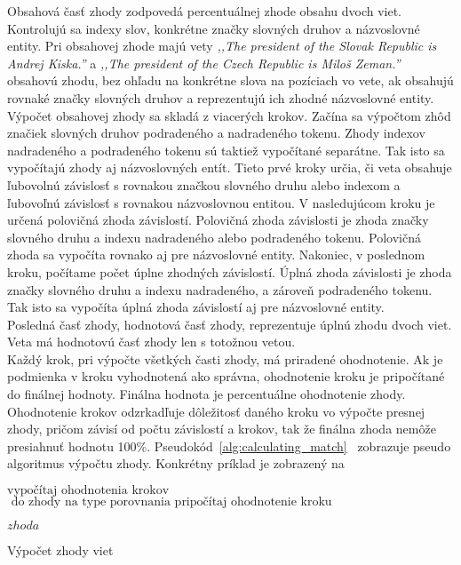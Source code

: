 Obsahová časť zhody zodpovedá percentuálnej zhode obsahu dvoch viet. Kontrolujú sa indexy slov, konkrétne značky slovných druhov a názvoslovné entity. Pri obsahovej zhode majú vety \textit{,,The president of the Slovak Republic is Andrej Kiska.''} a \textit{,,The president of the Czech Republic is Miloš Zeman.''} obsahovú zhodu, bez ohľadu na konkrétne slova na pozíciach vo vete, ak obsahujú rovnaké značky slovných druhov a reprezentujú ich zhodné názvoslovné entity. Výpočet obsahovej zhody sa skladá z viacerých krokov. Začína sa výpočtom zhôd značiek slovných druhov podradeného a nadradeného tokenu. Zhody indexov nadradeného a podradeného tokenu sú taktiež vypočítané separátne. Tak isto sa vypočítajú zhody aj názvoslovných entít. Tieto prvé kroky určia, či veta obsahuje ľubovolnú závislosť s rovnakou značkou slovného druhu alebo indexom a ľubovoľnú závislosť s rovnakou názvoslovnou entitou. V nasledujúcom kroku je určená polovičná zhoda závislostí. Polovičná zhoda závislosti je zhoda značky slovného druhu a indexu nadradeného alebo podradeného tokenu. Polovičná zhoda sa vypočíta rovnako aj pre názvoslovné entity. Nakoniec, v poslednom kroku, počítame počet úplne zhodných závislostí. Úplná zhoda závislosti je zhoda značky slovného druhu a indexu nadradeného, a zároveň podradeného tokenu. Tak isto sa vypočíta úplná zhoda závislostí aj pre názvoslovné entity. \\

Posledná časť zhody, hodnotová časť zhody, reprezentuje úplnú zhodu dvoch viet. Veta má hodnotovú časť zhody len s totožnou vetou. \\

Každý krok, pri výpočte všetkých časti zhody, má priradené ohodnotenie. Ak je podmienka v kroku vyhodnotená ako správna, ohodnotenie kroku je pripočítané do finálnej hodnoty. Finálna hodnota je percentuálne ohodnotenie zhody. Ohodnotenie krokov odzrkadľuje dôležitosť daného kroku vo výpočte presnej zhody, pričom závisí od počtu závislostí a krokov, tak že finálna zhoda nemôže presiahnuť hodnotu 100\%. Pseudokód~\ref{alg:calculating_match}~ zobrazuje pseudo algoritmus výpočtu zhody. Konkrétny príklad je zobrazený na~

\begin{algorithm}[H]
	\footnotesize %
	\begin{algorithmic}[1]

		\State $\text{vypočítaj ohodnotenia krokov}$
		\State $\text{ do zhody na type porovnania pripočítaj ohodnotenie kroku}$
		\EndIf
		\EndFor
		\EndFor
		\EndFor
		
		\Return $zhoda$
		\EndProcedure
	\end{algorithmic}
	\caption[Výpočet zhody viet]{Výpočet zhody viet}	
	\label{alg:calculating_match}
\end{algorithm}

